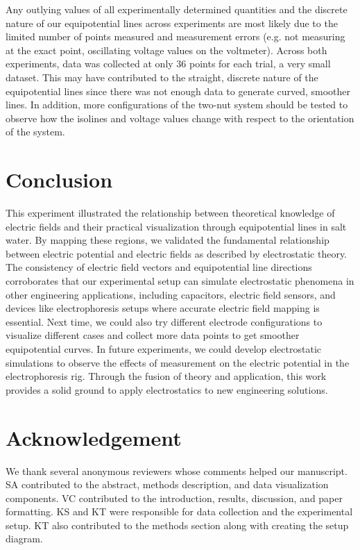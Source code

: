 \documentclass[10pt,journal,twoside]{IEEEtran}
\begin{document}
Any outlying values of all experimentally determined quantities and the discrete nature of our equipotential lines across experiments are most likely due to the limited number of points measured and measurement errors (e.g. not measuring at the exact point, oscillating voltage values on the voltmeter). Across both experiments, data was collected at only 36 points for each trial, a very small dataset. This may have contributed to the straight, discrete nature of the equipotential lines since there was not enough data to generate curved, smoother lines. In addition, more configurations of the two-nut system should be tested to observe how the isolines and voltage values change with respect to the orientation of the system.





\section{Conclusion}
This experiment illustrated the relationship between theoretical knowledge of electric fields and their practical visualization through equipotential lines in salt water. By mapping these regions, we validated the fundamental relationship between electric potential and electric fields as described by electrostatic theory. The consistency of electric field vectors and equipotential line directions corroborates that our experimental setup can simulate electrostatic phenomena in other engineering applications, including capacitors, electric field sensors, and devices like electrophoresis setups where accurate electric field mapping is essential. Next time, we could also try different electrode configurations to visualize different cases and collect more data points to get smoother equipotential curves. In future experiments, we could develop electrostatic simulations to observe the effects of measurement on the electric potential in the electrophoresis rig. Through the fusion of theory and application, this work provides a solid ground to apply electrostatics to new engineering solutions.  






\section{Acknowledgement}
We thank several anonymous reviewers whose comments helped our manuscript.  SA contributed to the abstract, methods description, and data visualization components. VC contributed to the introduction, results, discussion, and paper formatting. KS and KT were responsible for data collection and the experimental setup. KT also contributed to the methods section along with creating the setup diagram. 
\end{document}
